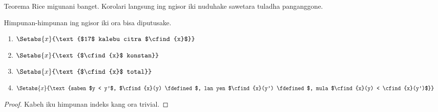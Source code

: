 \documentclass[../../../include/open-logic-section]{subfiles}
\begin{document}
Teorema Rice migunani banget. Korolari langsung
ing ngisor iki nuduhake sawetara tuladha panganggone.
\begin{cor}
Himpunan-himpunan ing ngisor iki ora bisa diputusake.
\begin{enumerate}
\item $\Setabs{x}{\text{$17$ kalebu citra $\cfind{x}$}}$
\item $\Setabs{x}{\text{$\cfind{x}$ konstan}}$
\item $\Setabs{x}{\text{$\cfind{x}$ total}}$
\item $\Setabs{x}{\text{saben $y < y'$, $\cfind{x}(y) \fdefined$, lan
    yen $\cfind{x}(y') \fdefined$, mula $\cfind{x}(y) < \cfind{x}(y')$}}$
\end{enumerate}
\end{cor}

\begin{proof}
  Kabeh iku himpunan indeks kang ora trivial.
\end{proof}
\end{document}
